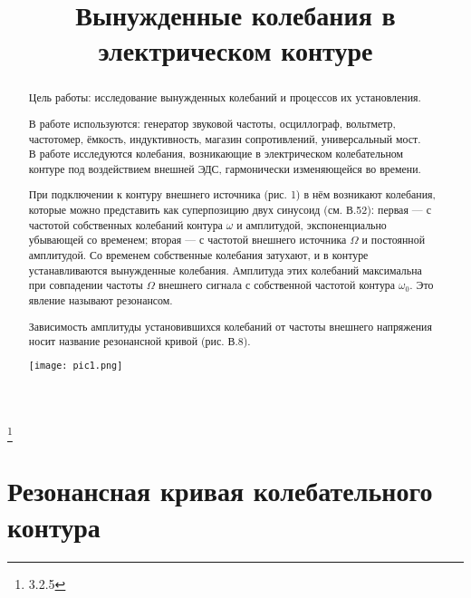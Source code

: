 


\title{Вынужденные
колебания
в электрическом
контуре}
\thanks{3.2.5}



\begin{abstract}
Цель работы: исследование вынужденных
колебаний
и процессов их
установления.

В работе используются: генератор звуковой частоты, осциллограф,
вольтметр, частотомер, ёмкость, индуктивность, магазин сопротивлений, универсальный мост.\\

В работе исследуются
колебания, возникающие
в электрическом
колебательном
контуре под воздействием внешней
ЭДС, гармонически изменяющейся во времени.

При подключении
к
контуру внешнего источника (рис. 1) в нём возникают
колебания, которые
можно представить
как суперпозицию двух синусоид (см. В.52): первая — с частотой собственных
колебаний
контура $\omega$
и амплитудой, экспоненциально
убывающей со временем; вторая — с частотой внешнего источника $\Omega$
и постоянной амплитудой. Со временем собственные
колебания затухают, и в контуре устанавливаются вынужденные
колебания. Амплитуда этих колебаний
максимальна при совпадении частоты
$\Omega$ внешнего сигнала с собственной частотой
контура $\omega_0$. Это явление называют резонансом.

Зависимость амплитуды
установившихся
колебаний от частоты внешнего напряжения носит название резонансной кривой (рис. В.8).
\begin{center}
\texttt{[image: pic1.png]}
\end{center}


\end{abstract}

\maketitle


\section{\label{sec:level1}Резонансная кривая
колебательного
контура}

